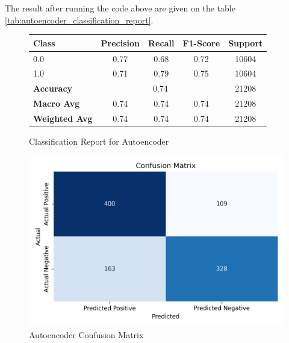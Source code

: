 \noindent The result after running the code above are given on the table \ref{tab:autoencoder_classification_report}.

\begin{figure}[h!]
    \centering
    \begin{minipage}[b]{0.4\textwidth}
        \centering
        \begin{tabular}{lcccc}
            \hline
            \textbf{Class} & \textbf{Precision} & \textbf{Recall} & \textbf{F1-Score} & \textbf{Support} \\
            \hline
            0.0 & 0.77 & 0.68 & 0.72 & 10604 \\
            1.0 & 0.71 & 0.79 & 0.75 & 10604 \\
            \hline
            \textbf{Accuracy} & \multicolumn{3}{c}{0.74} & 21208 \\
            \textbf{Macro Avg} & 0.74 & 0.74 & 0.74 & 21208 \\
            \textbf{Weighted Avg} & 0.74 & 0.74 & 0.74 & 21208 \\
            \hline
        \end{tabular}
        \caption{Classification Report for Autoencoder}
        \label{tab:autoencoder_classification_report}

        \vspace{1.5cm}
    \end{minipage}
    \hfill
    \begin{minipage}[b]{0.4\textwidth}
        \centering
        \includegraphics[width=\textwidth]{images/autoencoder_confusion_matrix.png}
        \caption{Autoencoder Confusion Matrix}
        \label{fig:autoencoder_cfm}
    \end{minipage}
\end{figure}